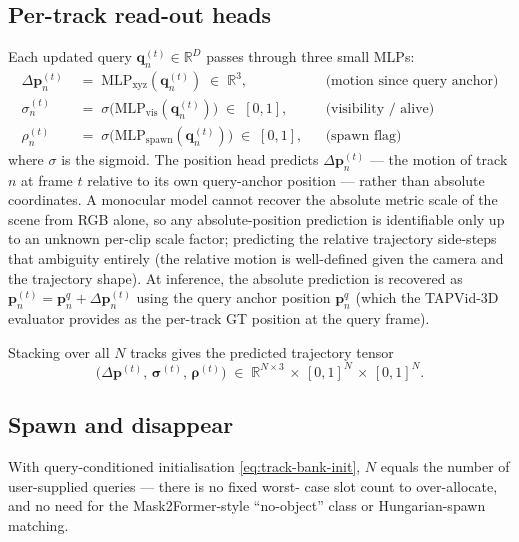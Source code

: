 \documentclass[11pt,a4paper]{article}
\begin{document}
\subsection{Per-track read-out heads}
\label{sec:track-heads}

Each updated query $\bm{q}_n^{(t)} \in \mathbb{R}^{D}$ passes through
three small MLPs:
\begin{align}
  \Delta\bm{p}_n^{(t)} &\;=\; \mathrm{MLP}_{\text{xyz}}(\bm{q}_n^{(t)}) \;\in\; \mathbb{R}^{3},
  & &\text{(motion since query anchor)}\\
  \sigma_n^{(t)} &\;=\; \sigma\!\bigl(\mathrm{MLP}_{\text{vis}}(\bm{q}_n^{(t)})\bigr) \;\in\; [0, 1],
  & &\text{(visibility / alive)}\\
  \rho_n^{(t)}   &\;=\; \sigma\!\bigl(\mathrm{MLP}_{\text{spawn}}(\bm{q}_n^{(t)})\bigr) \;\in\; [0, 1],
  & &\text{(spawn flag)}
\end{align}
where $\sigma$ is the sigmoid. The position head predicts
$\Delta\bm{p}_n^{(t)}$ — the motion of track $n$ at frame $t$ relative
to its own query-anchor position — rather than absolute coordinates.
A monocular model cannot recover the absolute metric scale of the
scene from RGB alone, so any absolute-position prediction is
identifiable only up to an unknown per-clip scale factor; predicting
the relative trajectory side-steps that ambiguity entirely (the
relative motion is well-defined given the camera and the trajectory
shape). At inference, the absolute prediction is recovered as
$\bm{p}_n^{(t)} = \bm{p}_n^{q} + \Delta\bm{p}_n^{(t)}$ using the query
anchor position $\bm{p}_n^{q}$ (which the TAPVid-3D evaluator provides
as the per-track GT position at the query frame).

Stacking over all $N$ tracks gives the predicted trajectory tensor
\begin{equation}
  \bigl(\Delta\bm{p}^{(t)},\,\bm{\sigma}^{(t)},\,\bm{\rho}^{(t)}\bigr)
  \;\in\; \mathbb{R}^{N\times 3}\,\times\,[0,1]^{N}\,\times\,[0,1]^{N}.
\end{equation}

\subsection{Spawn and disappear}
\label{sec:track-spawn}

With query-conditioned initialisation \eqref{eq:track-bank-init}, $N$
equals the number of user-supplied queries — there is no fixed worst-
case slot count to over-allocate, and no need for the Mask2Former-style
``no-object'' class or Hungarian-spawn matching.
\end{document}
